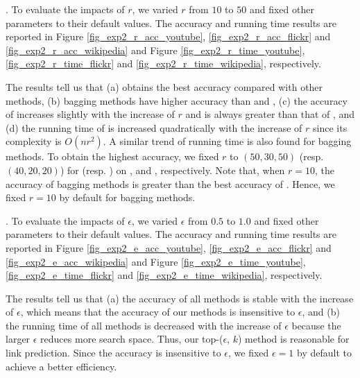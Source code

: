 . To evaluate the impacts of $r$, we
varied $r$ from $10$ to $50$ and fixed other parameters to their
default values. The accuracy and running time results are reported in
Figure \ref{fig_exp2_r_acc_youtube}, \ref{fig_exp2_r_acc_flickr} and
\ref{fig_exp2_r_acc_wikipedia} and Figure \ref{fig_exp2_r_time_youtube},
\ref{fig_exp2_r_time_flickr} and \ref{fig_exp2_r_time_wikipedia}, respectively.



The results tell us that (a) \Biased obtains the best accuracy compared with other
methods, (b) bagging methods have higher accuracy than \NMF and \BIGCLAM,
(c) the accuracy of \NMF increases slightly with the increase of $r$ and is always
greater than that of \BIGCLAM, and (d) the running time of \NMF is increased
quadratically with the increase of $r$ since its complexity is $O(nr^2)$.
A similar trend of running time is also found for bagging methods. To obtain the
highest accuracy, we fixed $r$ to $(50, 30, 50)$ (resp. $(40, 20, 20)$) for \NMF
(resp. \BIGCLAM) on \YouTube, \Flickr and \Wikipedia, respectively. Note that, when $r = 10$,
the accuracy of bagging methods is greater than the best accuracy of \NMF. Hence, we
fixed $r = 10$ by default for bagging methods.




. To evaluate the impacts of $\epsilon$, we
varied $\epsilon$ from $0.5$ to $1.0$ and fixed other parameters to their
default values. The accuracy and running time results are reported in
Figure \ref{fig_exp2_e_acc_youtube}, \ref{fig_exp2_e_acc_flickr} and
\ref{fig_exp2_e_acc_wikipedia} and Figure \ref{fig_exp2_e_time_youtube},
\ref{fig_exp2_e_time_flickr} and \ref{fig_exp2_e_time_wikipedia}, respectively.



The results tell us that (a) the accuracy of all methods is stable with
the increase of $\epsilon$, which means that the accuracy of our methods is insensitive
to $\epsilon$, and (b) the running time of all methods is decreased with the increase of $\epsilon$
because the larger $\epsilon$ reduces more search space. Thus, our top-($\epsilon$, $k$)
method is reasonable for link prediction. Since the accuracy is insensitive to $\epsilon$, we
fixed $\epsilon = 1$ by default to achieve a better efficiency.






